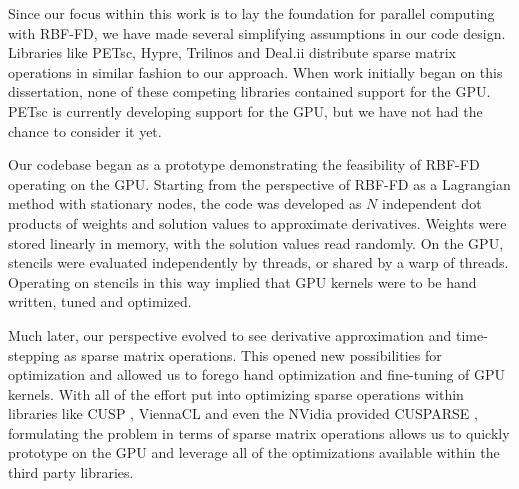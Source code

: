 Since our focus within this work is to lay the foundation for parallel computing
with RBF-FD, we have made several simplifying assumptions in our code design.
Libraries like PETsc, Hypre, Trilinos and Deal.ii distribute sparse matrix
operations in similar fashion to our approach. When work initially began on this
dissertation, none of these competing libraries contained support for the GPU.
PETsc is currently developing support for the GPU, but we have not had the
chance to consider it yet. 

Our codebase began as a prototype demonstrating the feasibility of RBF-FD
operating on the GPU. Starting from the perspective of RBF-FD as a Lagrangian
method with stationary nodes, the code was developed as $N$ independent dot
products of weights and solution values to approximate derivatives. Weights were
stored linearly in memory, with the solution values read randomly. On the GPU,
stencils were evaluated independently by threads, or shared by a warp of
threads. Operating on stencils in this way implied that GPU kernels were to be
hand written, tuned and optimized. 

Much later, our perspective evolved to see derivative approximation and
time-stepping as sparse matrix operations. This opened new possibilities for
optimization and allowed us to forego hand optimization and fine-tuning of GPU
kernels. With all of the effort put into optimizing sparse operations within
libraries like CUSP \cite{Bell2009}, ViennaCL \cite{Rupp2010} and even the
NVidia provided CUSPARSE \cite{CUSPARSE}, formulating the problem in terms of
sparse matrix operations allows us to quickly prototype on the GPU and leverage
all of the optimizations available within the third party libraries. 

 


